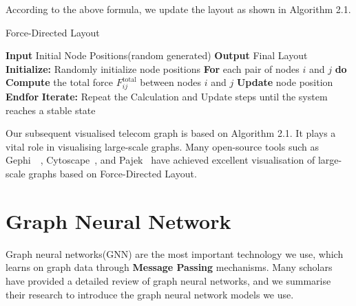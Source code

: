 \documentclass[ %
                    author={Tengyao Tu},
                supervisor={Dr. James Pope},
                    degree={MSc},
                     title={A New Perspective on Graph Community Detection: Combining Traditional Methods with Deep Learning Approaches},
                  subtitle={Applying to Telecom Networks and Diverse Datasets},
                      type={},
                      year={2024}]{dissertation}
\begin{document}
According to the above formula, we update the layout as shown in Algorithm 2.1.
\begin{algorithm}[ht!]
\caption{Force-Directed Layout}
\begin{framedalgorithm}[ht!]
    
    \State \textbf{Input} Initial Node Positions(random generated)\newline 
    \State \textbf{Output} Final Layout\newline
    \State \textbf{Initialize:} Randomly initialize node positions\newline
     \State \textbf{For} each pair of nodes $i$ and $j$ \textbf{do}\newline
     \State  \phantom{hold}\textbf{Compute} the total force $F_{ij}^{\text{total}}$ between nodes $i$ and $j$\newline
     \State \phantom{hold}\textbf{Update} node position \newline
     \State \textbf{Endfor}\newline
      \State \textbf{Iterate:} Repeat the  Calculation and Update steps until the system reaches a stable state\newline
\end{framedalgorithm}
\end{algorithm}
Our subsequent visualised telecom graph is based on Algorithm 2.1. It plays a vital role in visualising large-scale graphs. Many open-source tools such as Gephi~\cite{bastian2009gephi}~\cite{grandjean2015gephi}, Cytoscape~\cite{shannon2003cytoscape}, and Pajek~\cite{mrvar2020pajek} have achieved excellent visualisation of large-scale graphs based on Force-Directed Layout.
\section{Graph Neural Network}
Graph neural networks(GNN) are the most important technology we use, which learns on graph data through \textbf{Message Passing} mechanisms. Many scholars~\cite{wu2020comprehensive}~\cite{khemani2024review}~\cite{zhou2020graph} have provided a detailed review of graph neural networks, and we summarise their research to introduce the graph neural network models we use.
\end{document}
